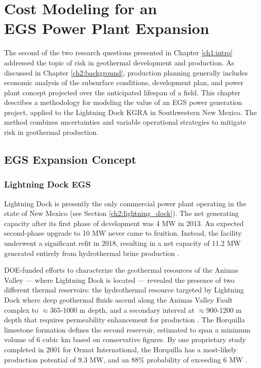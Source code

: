 \chapter{Cost Modeling for an\\EGS Power Plant Expansion}\label{ch4:cm_prep}

The second of the two research questions presented in Chapter \ref{ch1:intro} addressed the topic of risk in geothermal development and production. As discussed in Chapter \ref{ch2:background}, production planning generally includes economic analysis of the subsurface conditions, development plan, and power plant concept projected over the anticipated lifespan of a field. This chapter describes a methodology for modeling the value of an EGS power generation project, applied to the Lightning Dock KGRA in Southwestern New Mexico. The method combines uncertainties and variable operational strategies to mitigate risk in geothermal production.

\section{EGS Expansion Concept}\label{ch4:cm_concept}
\subsection{Lightning Dock EGS}\label{ch4:lightning_dock_egs}
Lightning Dock is presently the only commercial power plant operating in the state of New Mexico (see Section \ref{ch2:lightning_dock}). The net generating capacity after its first phase of development was 4 MW in 2013. An expected second-phase upgrade to 10 MW never came to fruition. Instead, the facility underwent a significant refit in 2018, resulting in a net capacity of 11.2 MW generated entirely from hydrothermal brine production \citep{bonafin_repowering_2019}.

DOE-funded efforts to characterize the geothermal resources of the Animas Valley --- where Lightning Dock is located --- revealed the presence of two different thermal reservoirs: the hydrothermal resource targeted by Lightning Dock where deep geothermal fluids ascend along the Animas Valley Fault complex to $\approx$365-1000 m depth, and a secondary interval at $\approx$900-1200 m depth that requires permeability enhancement for production \citep{schochet_development_2001}. The Horquilla limestone formation defines the second reservoir, estimated to span a minimum volume of 6 cubic km based on conservative figures. By one proprietary study completed in 2001 for Ormat International, the Horquilla has a most-likely production potential of 9.3 MW, and an 88\% probability of exceeding 6 MW \citep{schochet_development_2001}.

